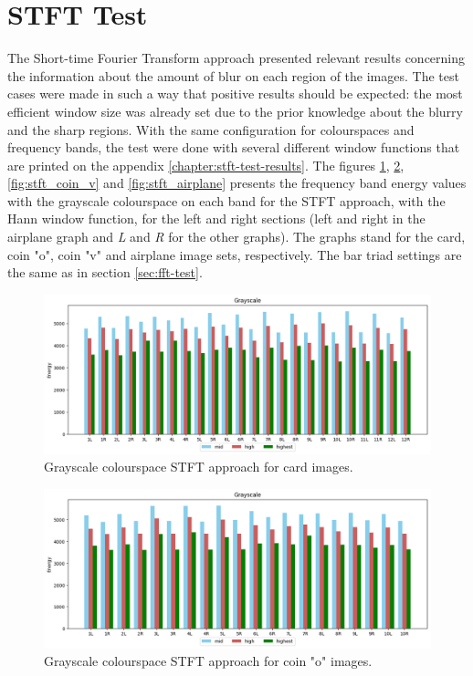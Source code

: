 \section{STFT Test}

The Short-time Fourier Transform approach presented relevant results concerning the information about the amount of blur on each region of the images. The test cases were made in such a way that positive results should be expected: the most efficient window size was already set due to the prior knowledge about the blurry and the sharp regions. With the same configuration for colourspaces and frequency bands, the test were done with several different window functions that are printed on the appendix \ref{chapter:stft-test-results}. The figures \ref{fig:stft_card}, \ref{fig:stft_coin_o}, \ref{fig:stft_coin_v} and \ref{fig:stft_airplane} presents the frequency band energy values with the grayscale colourspace on each band for the STFT approach, with the Hann window function, for the left and right sections (left and right in the airplane graph and \emph{L} and \emph{R} for the other graphs). The graphs stand for the card, coin "o", coin "v" and airplane image sets, respectively. The bar triad settings are the same as in section \ref{sec:fft-test}.


\begin{figure}[ht]
	\centering
	\caption{\label{fig:stft_card}Grayscale colourspace STFT approach for card images.}
	\begin{center}
	    \includegraphics[scale=0.52, trim = {0 1cm 0 1cm}]{images/fig21.png}
	\end{center}
	\centering
    \fautor
\end{figure}

\begin{figure}[ht]
	\centering
	\caption{\label{fig:stft_coin_o}Grayscale colourspace STFT approach for coin "o" images.}
	\begin{center}
	    \includegraphics[scale=0.52, trim = {0 1cm 0 1cm}]{images/fig22.png}
	\end{center}
	\centering
    \fautor
\end{figure}

